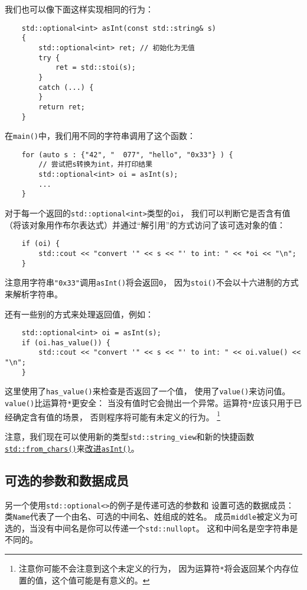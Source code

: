 我们也可以像下面这样实现相同的行为：
\begin{lstlisting}
    std::optional<int> asInt(const std::string& s)
    {
        std::optional<int> ret; // 初始化为无值
        try {
            ret = std::stoi(s);
        }
        catch (...) {
        }
        return ret;
    }
\end{lstlisting}
在\texttt{main()}中，我们用不同的字符串调用了这个函数：
\begin{lstlisting}
    for (auto s : {"42", "  077", "hello", "0x33"} ) {
        // 尝试把s转换为int，并打印结果
        std::optional<int> oi = asInt(s);
        ...
    }
\end{lstlisting}
对于每一个返回的\texttt{std::optional<int>}类型的\texttt{oi}，
我们可以判断它是否含有值（将该对象用作布尔表达式）并通过“解引用”的方式访问了该可选对象的值：
\begin{lstlisting}
    if (oi) {
        std::cout << "convert '" << s << "' to int: " << *oi << "\n";
    }
\end{lstlisting}
注意用字符串\texttt{"0x33"}调用\texttt{asInt()}将会返回\texttt{0}，
因为\texttt{stoi()}不会以十六进制的方式来解析字符串。

还有一些别的方式来处理返回值，例如：
\begin{lstlisting}
    std::optional<int> oi = asInt(s);
    if (oi.has_value()) {
        std::cout << "convert '" << s << "' to int: " << oi.value() << "\n";
    }
\end{lstlisting}
这里使用了\texttt{has\_value()}来检查是否返回了一个值，
使用了\texttt{value()}来访问值。\texttt{value()}比运算符\texttt{*}更安全：
当没有值时它会抛出一个异常。运算符\texttt{*}应该只用于已经确定含有值的场景，
否则程序将可能有未定义的行为。
\footnote{注意你可能不会注意到这个未定义的行为，
因为运算符\texttt{*}将会返回某个内存位置的值，这个值可能是有意义的。}

注意，我们现在可以使用新的类型\texttt{std::string\_view}和新的快捷函数\hyperref[ch31.2.1]
{\texttt{std::from\_chars()}}来\hyperref[改进asInt]{改进\texttt{asInt()}}。

\subsection{可选的参数和数据成员}
另一个使用\texttt{std::optional<>}的例子是传递可选的参数和
设置可选的数据成员：
类\texttt{Name}代表了一个由名、可选的中间名、姓组成的姓名。
成员\texttt{middle}被定义为可选的，当没有中间名是你可以传递一个\texttt{std::nullopt}。
这和中间名是空字符串是不同的。

